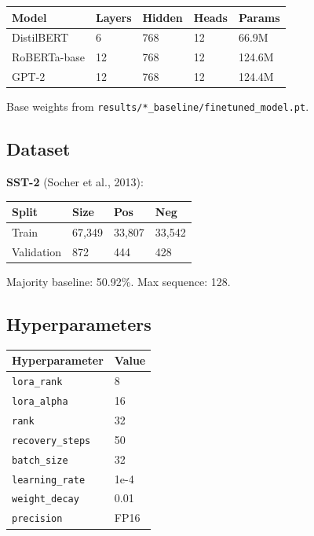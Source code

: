 \begin{table}[H]
\centering
\small
\begin{tabular}{lllll}
\toprule
\textbf{Model} & \textbf{Layers} & \textbf{Hidden} & \textbf{Heads} & \textbf{Params} \\
\midrule
DistilBERT & 6 & 768 & 12 & 66.9M \\
RoBERTa-base & 12 & 768 & 12 & 124.6M \\
GPT-2 & 12 & 768 & 12 & 124.4M \\
\bottomrule
\end{tabular}
\end{table}

Base weights from \texttt{results/*\_baseline/finetuned\_model.pt}.

\subsection{Dataset}

\textbf{SST-2} (Socher et al., 2013):

\begin{table}[H]
\centering
\small
\begin{tabular}{llll}
\toprule
\textbf{Split} & \textbf{Size} & \textbf{Pos} & \textbf{Neg} \\
\midrule
Train & 67,349 & 33,807 & 33,542 \\
Validation & 872 & 444 & 428 \\
\bottomrule
\end{tabular}
\end{table}

Majority baseline: 50.92\%. Max sequence: 128.

\subsection{Hyperparameters}

\begin{table}[H]
\centering
\small
\begin{tabular}{ll}
\toprule
\textbf{Hyperparameter} & \textbf{Value} \\
\midrule
\texttt{lora\_rank} & 8 \\
\texttt{lora\_alpha} & 16 \\
\texttt{rank} & 32 \\
\texttt{recovery\_steps} & 50 \\
\texttt{batch\_size} & 32 \\
\texttt{learning\_rate} & 1e-4 \\
\texttt{weight\_decay} & 0.01 \\
\texttt{precision} & FP16 \\
\bottomrule
\end{tabular}
\end{table}

